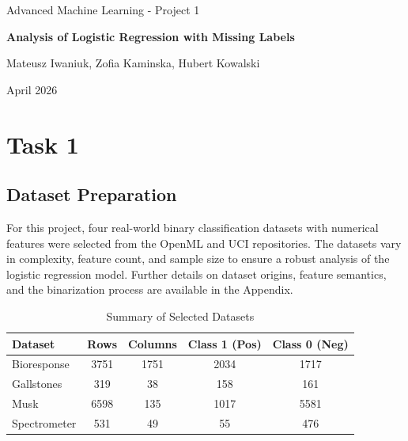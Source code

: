 \documentclass{article}
\begin{document}
\begin{titlepage}
    \centering 
    \vspace*{\fill} 

    {\LARGE \textnormal{Advanced Machine Learning - Project 1} \par}
    \vspace{0.5em}
    {\huge \textbf{Analysis of Logistic Regression with Missing Labels} \par}
    
    \vspace{2cm} 
    
    {\large Mateusz Iwaniuk, Zofia Kaminska, Hubert Kowalski \par}
    
    \vspace{1cm}
    
    {\large April 2026 \par}

    \vspace*{\fill} 
\end{titlepage}

\newpage
\tableofcontents 
\newpage 

\section{Task 1}
\subsection{Dataset Preparation}
For this project, four real-world binary classification datasets with numerical features were selected from the OpenML and UCI repositories. The datasets vary in complexity, feature count, and sample size to ensure a robust analysis of the logistic regression model. Further details on dataset origins, feature semantics, and the binarization process are available in the Appendix.

\begin{table}[H]
\centering
\caption{Summary of Selected Datasets}
\vspace{0.5em}
\begin{tabular}{lcccc}
\toprule
\textbf{Dataset} & \textbf{Rows} & \textbf{Columns} & \textbf{Class 1 (Pos)} & \textbf{Class 0 (Neg)} \\ 
\midrule
Bioresponse  & 3751 & 1751 & 2034 & 1717  \\ 
Gallstones   & 319  & 38   & 158  & 161   \\ 
Musk         & 6598 & 135  & 1017 & 5581  \\ 
Spectrometer & 531  & 49   & 55   & 476   \\ 
\bottomrule
\end{tabular}
\end{table}
\end{document}
